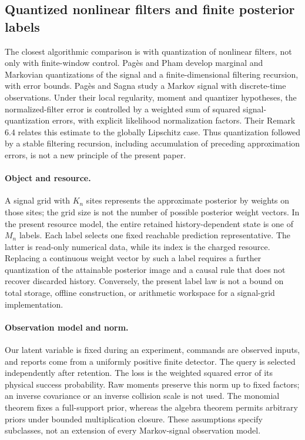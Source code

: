 \subsection{Quantized nonlinear filters and finite posterior labels}
\label{sec:filter-quantization-comparison}
The closest algorithmic comparison is with quantization of nonlinear
filters, not only with finite-window control. Pag\`es and Pham
\cite{PagesPham2005} develop marginal and Markovian quantizations of
the signal and a finite-dimensional filtering recursion, with error
bounds. Pag\`es and Sagna \cite[Section 6, Theorem 6.3 and
Remark 6.4]{PagesSagna2018} study a Markov signal with discrete-time
observations. Under their local regularity, moment and quantizer
hypotheses, the normalized-filter error is controlled by a weighted
sum of squared signal-quantization errors, with explicit likelihood
normalization factors. Their Remark 6.4 relates this estimate to the
globally Lipschitz case. Thus quantization followed by a stable
filtering recursion, including accumulation of preceding approximation
errors, is not a new principle of the present paper.

\paragraph{Object and resource.}
A signal grid with $K_n$ sites represents the approximate posterior by
weights on those sites; the grid size is not the number of possible
posterior weight vectors. In the present resource model, the entire
retained history-dependent state is one of $M_n$ labels. Each label
selects one fixed reachable prediction representative. The latter is
read-only numerical data, while its index is the charged resource.
Replacing a continuous weight vector by such a label requires a further
quantization of the attainable posterior image and a causal rule that
does not recover discarded history. Conversely, the present label law
is not a bound on total storage, offline construction, or arithmetic
workspace for a signal-grid implementation.

\paragraph{Observation model and norm.}
Our latent variable is fixed during an experiment, commands are observed
inputs, and reports come from a uniformly positive finite detector.
The query is selected independently after retention. The loss is the
weighted squared error of its physical success probability. Raw moments
preserve this norm up to fixed factors; an inverse covariance or an
inverse collision scale is not used. The monomial theorem fixes a
full-support prior, whereas the algebra theorem permits arbitrary priors
under bounded multiplication closure. These assumptions specify
subclasses, not an extension of every Markov-signal observation model.

